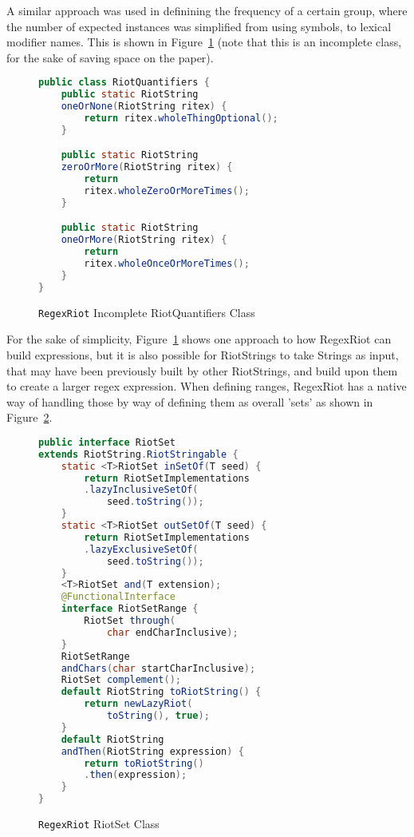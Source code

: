 \documentclass[conference]{IEEEtran}
\begin{document}
A similar approach was used in definining the frequency of a certain group,
where the number of expected instances was simplified from using symbols,
to lexical modifier names. This is shown in Figure~\ref{fig:regexriot-quantifiers}
(note that this is an incomplete class, for the sake of saving space
on the paper).

\begin{figure}[htbp]
    \centering
    \label{fig:regexriot-quantifiers}
    \begin{lstlisting}[language=Java]
public class RiotQuantifiers {
    public static RiotString 
    oneOrNone(RiotString ritex) {
        return ritex.wholeThingOptional();
    }

    public static RiotString 
    zeroOrMore(RiotString ritex) {
        return 
        ritex.wholeZeroOrMoreTimes();
    }

    public static RiotString 
    oneOrMore(RiotString ritex) {
        return 
        ritex.wholeOnceOrMoreTimes();
    }
}
    \end{lstlisting}
    \caption{\texttt{RegexRiot} Incomplete RiotQuantifiers Class}
\end{figure}

For the sake of simplicity, Figure~\ref{fig:regexriot-quantifiers} shows one approach to how
RegexRiot can build expressions, but it is also possible for RiotStrings
to take Strings as input, that may have been previously built by other
RiotStrings, and build upon them to create a larger regex expression.
When defining ranges, RegexRiot has a native way of handling those by way
of defining them as overall 'sets' as shown in Figure~\ref{fig:regexriot-riotset}.

\begin{figure}[htbp]
    \centering
    \label{fig:regexriot-riotset}
    \begin{lstlisting}[language=Java]
public interface RiotSet 
extends RiotString.RiotStringable {
    static <T>RiotSet inSetOf(T seed) {
        return RiotSetImplementations
        .lazyInclusiveSetOf(
            seed.toString());
    }
    static <T>RiotSet outSetOf(T seed) {
        return RiotSetImplementations
        .lazyExclusiveSetOf(
            seed.toString());
    }
    <T>RiotSet and(T extension);
    @FunctionalInterface
    interface RiotSetRange {
        RiotSet through(
            char endCharInclusive);
    }
    RiotSetRange 
    andChars(char startCharInclusive);
    RiotSet complement();
    default RiotString toRiotString() {
        return newLazyRiot(
            toString(), true);
    }
    default RiotString 
    andThen(RiotString expression) {
        return toRiotString()
        .then(expression);
    }
}
    \end{lstlisting}
    \caption{\texttt{RegexRiot} RiotSet Class}
\end{figure}
\end{document}
